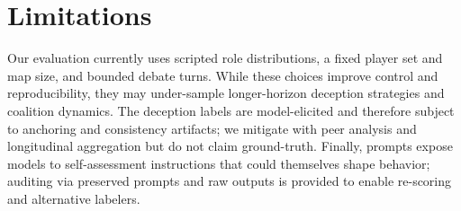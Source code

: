 \documentclass{article}
\begin{document}
\section{Limitations}
Our evaluation currently uses scripted role distributions, a fixed player set and map size, and bounded debate turns. While these choices improve control and reproducibility, they may under-sample longer-horizon deception strategies and coalition dynamics. The deception labels are model-elicited and therefore subject to anchoring and consistency artifacts; we mitigate with peer analysis and longitudinal aggregation but do not claim ground-truth. Finally, prompts expose models to self-assessment instructions that could themselves shape behavior; auditing via preserved prompts and raw outputs is provided to enable re-scoring and alternative labelers.

\appendix
\end{document}
